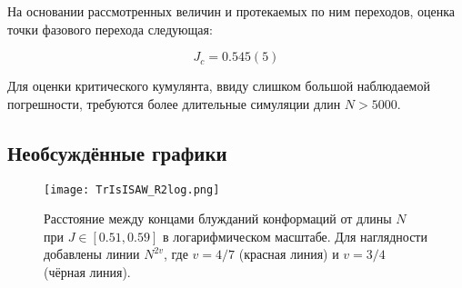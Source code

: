 На основании рассмотренных величин и протекаемых по ним переходов, оценка точки фазового перехода следующая:

\begin{equation}
	J_c = 0.545(5)
\end{equation}

Для оценки критического кумулянта, ввиду слишком большой наблюдаемой погрешности, требуются более длительные симуляции длин $N > 5000$.

\newpage

\subsection{Необсуждённые графики}

\begin{figure}[h]
\centering
\texttt{[image: TrIsISAW\_R2log.png]}
\caption{Расстояние между концами блужданий конформаций от длины $N$ при $J \in [0.51,0.59]$ в логарифмическом масштабе. 
Для наглядности добавлены линии $N^{2v}$, где $v = 4/7$ (красная линия) и $v=3/4$ (чёрная линия).}
\label{fig:TrIsISAW_R2log}
\end{figure}


